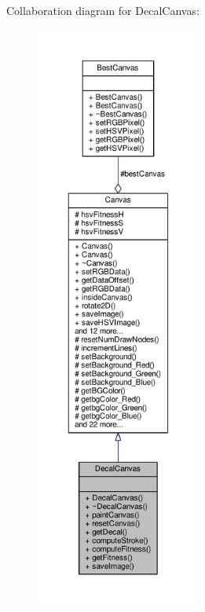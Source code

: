 Collaboration diagram for Decal\+Canvas\+:
\nopagebreak
\begin{figure}[H]
\begin{center}
\leavevmode
\includegraphics[height=550pt]{classDecalCanvas__coll__graph}
\end{center}
\end{figure}
